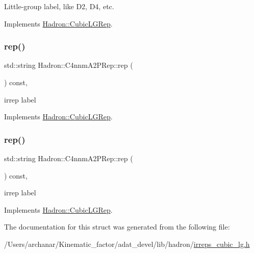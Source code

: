 Little-\/group label, like D2, D4, etc. 

Implements \mbox{\hyperlink{structHadron_1_1CubicLGRep_a9bdb14b519a611d21379ed96a3a9eb41}{Hadron\+::\+Cubic\+L\+G\+Rep}}.

\mbox{\label{structHadron_1_1C4nnmA2PRep_ab36717b439585aa0134698e1fa6802b2}} 
\subsubsection{\texorpdfstring{rep()}{rep()}\hspace{0.1cm}{\footnotesize\ttfamily [1/2]}}
{\footnotesize\ttfamily std\+::string Hadron\+::\+C4nnm\+A2\+P\+Rep\+::rep (\begin{DoxyParamCaption}{ }\end{DoxyParamCaption}) const\hspace{0.3cm}{\ttfamily [inline]}, {\ttfamily [virtual]}}

irrep label 

Implements \mbox{\hyperlink{structHadron_1_1CubicLGRep_a50f5ddbb8f4be4cee0106fa9e8c75e6c}{Hadron\+::\+Cubic\+L\+G\+Rep}}.

\mbox{\label{structHadron_1_1C4nnmA2PRep_ab36717b439585aa0134698e1fa6802b2}} 
\subsubsection{\texorpdfstring{rep()}{rep()}\hspace{0.1cm}{\footnotesize\ttfamily [2/2]}}
{\footnotesize\ttfamily std\+::string Hadron\+::\+C4nnm\+A2\+P\+Rep\+::rep (\begin{DoxyParamCaption}{ }\end{DoxyParamCaption}) const\hspace{0.3cm}{\ttfamily [inline]}, {\ttfamily [virtual]}}

irrep label 

Implements \mbox{\hyperlink{structHadron_1_1CubicLGRep_a50f5ddbb8f4be4cee0106fa9e8c75e6c}{Hadron\+::\+Cubic\+L\+G\+Rep}}.



The documentation for this struct was generated from the following file\+:\begin{DoxyCompactItemize}
\item 
/\+Users/archanar/\+Kinematic\+\_\+factor/adat\+\_\+devel/lib/hadron/\mbox{\hyperlink{lib_2hadron_2irreps__cubic__lg_8h}{irreps\+\_\+cubic\+\_\+lg.\+h}}\end{DoxyCompactItemize}
